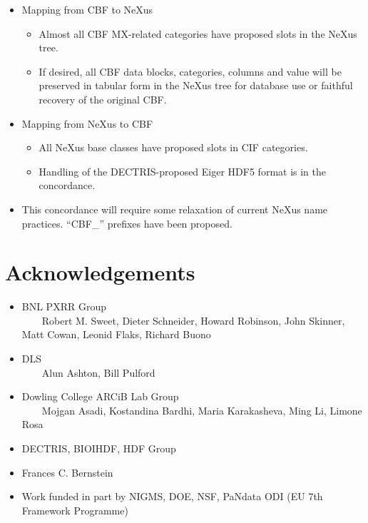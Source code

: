 \documentclass[11pt]{a0poster}
\begin{document}
\begin{minipage}[]{0.29\linewidth}
\begin{itemize}
\item{Mapping from CBF to NeXus
\begin{itemize}
\item{Almost all CBF MX-related categories have proposed slots in the NeXus tree.}
\item{If desired, all CBF data blocks, categories, columns and value will be preserved in
tabular form in the NeXus tree for database use or faithful recovery of the original CBF.}
\end{itemize}}

\item{Mapping from NeXus to CBF
\begin{itemize}
\item{All NeXus base classes have proposed slots in CIF categories.}
\item{Handling of the DECTRIS-proposed Eiger HDF5 format is in the concordance.}
\end{itemize}}

\item{This concordance will require some relaxation of current NeXus name practices.
``CBF\_'' prefixes have been proposed.}

\end{itemize}
\vspace{-6mm}

%



\vspace{-3mm}
\section*{Acknowledgements}

\begin{itemize}
\item{BNL PXRR Group\\
~~~~Robert M. Sweet, Dieter Schneider, Howard Robinson, John Skinner, Matt Cowan, 
Leonid Flaks, Richard Buono}
\vspace{-2mm}
\item{DLS\\
~~~~Alun Ashton, Bill Pulford}
\vspace{-2mm}
\item{Dowling College ARCiB Lab Group\\
~~~~Mojgan Asadi, Kostandina Bardhi, Maria Karakasheva, Ming Li, Limone Rosa}
\vspace{-2mm}
\item{DECTRIS, BIOIHDF, HDF Group}
\vspace{-2mm}
\item{Frances C. Bernstein}
\vspace{-2mm}
\item{Work funded in part by NIGMS, DOE, NSF, PaNdata ODI (EU 7th Framework Programme)}

\end{itemize}

\end{minipage}\hfill

\vfill
\end{document}
